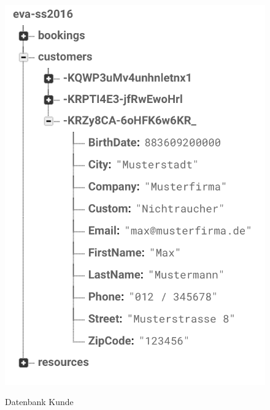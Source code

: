 \begin{figure}[H]
\begin{minipage}[t]{0.32\linewidth}
        \includegraphics[width=\linewidth]{images/backend_database_customers.png}
        \label{backend_database_customers}
        \caption{Datenbank Kunde}
    \end{minipage}
    \hfill
    \begin{minipage}[t]{0.32\linewidth}
        \centering

\end{minipage}
\end{figure}
